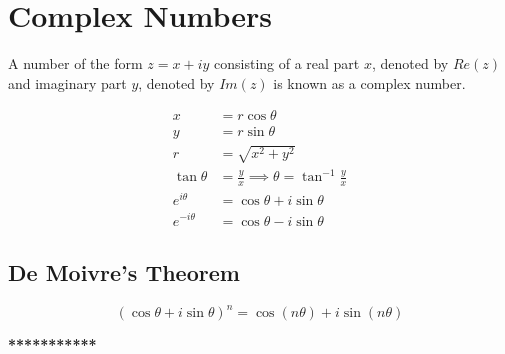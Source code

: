 \section{Complex Numbers}
A number of the form \(z = x + iy \) consisting of a real part \(x\), denoted by \( Re(z) \) and imaginary part \(y\), denoted by \( Im(z) \) is known as a complex number.

\begin{align}
x &= r\cos\theta \\
y &= r\sin\theta \\
r &= \sqrt{x^2 + y^2} \\
\tan\theta &= \frac{y}{x} \implies \theta = \tan^{-1}{\frac{y}{x}} \\
e^{i\theta} &= \cos\theta + i\sin\theta \\
e^{-i\theta} &= \cos\theta - i\sin\theta
\end{align}

\subsection{\textbf{De Moivre's Theorem}}
\begin{equation}
\label{demovire}
(\cos\theta + i\sin\theta)^{n} = \cos(n\theta) + i\sin(n\theta)
\end{equation}

\vspace{5mm}
\begin{center}
\textbf{***********}
\end{center}